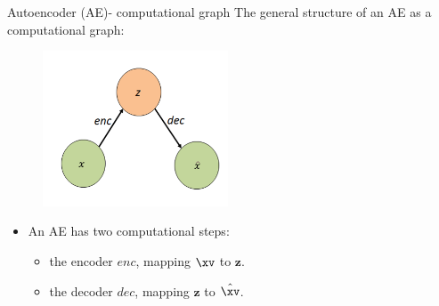 \begin{vbframe}{Autoencoder (AE)- computational graph}
  The general structure of an AE as a computational graph:
  \begin{figure}
    \centering
    \includegraphics[width=5.5cm]{plots/autoencoders_basic_structure_updated.png}
  \end{figure}
  \begin{itemize}
    \item An AE has two computational steps:
    \begin{itemize}
      \item the encoder $enc$, mapping $\xv$ to $\mathbf{z}$.
      \item the decoder $dec$, mapping $\mathbf{z}$ to $\hat\xv$.
    \end{itemize}
  \end{itemize}
\end{vbframe}
%
